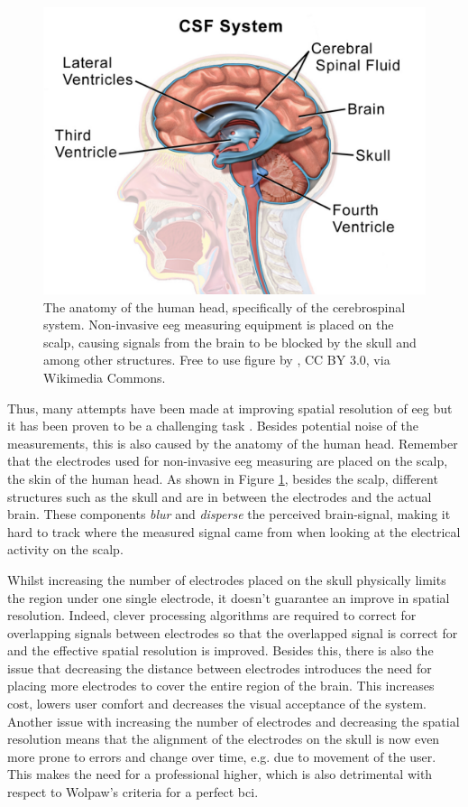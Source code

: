 \begin{figure}[ht]
    \centering
    \includegraphics[width=0.7\linewidth]{../images/introduction/brain_anatomy.pdf}
    \captionsetup{width=0.8\linewidth}
    \captionsetup{justification=centering}
    \caption{The anatomy of the human head, specifically of the cerebrospinal system. Non-invasive \gls{eeg} measuring equipment is placed on the scalp, causing signals from the brain to be blocked by the skull and  among other structures. Free to use figure by \citet{figure_blausen}, CC BY 3.0, via Wikimedia Commons.}
    \label{fig:brain_anatomy}
\end{figure}

Thus, many attempts have been made at improving spatial resolution of \gls{eeg} but it has been proven to be a challenging task \citep{spatial_resolution}.
Besides potential noise of the measurements, this is also caused by the anatomy of the human head.
Remember that the electrodes used for non-invasive \gls{eeg} measuring are placed on the scalp, the skin of the human head.
As shown in Figure \ref{fig:brain_anatomy}, besides the scalp, different structures such as the skull and  are in between the electrodes and the actual brain.
These components \textit{blur} and \textit{disperse} the perceived brain-signal, making it hard to track where the measured signal came from when looking at the electrical activity on the scalp.

Whilst increasing the number of electrodes placed on the skull physically limits the region under one single electrode, it doesn't guarantee an improve in spatial resolution.
Indeed, clever processing algorithms are required to correct for overlapping signals between electrodes so that the overlapped signal is correct for and the effective spatial resolution is improved.
Besides this, there is also the issue that decreasing the distance between electrodes introduces the need for placing more electrodes to cover the entire region of the brain.
This increases cost, lowers user comfort and decreases the visual acceptance of the system.
Another issue with increasing the number of electrodes and decreasing the spatial resolution means that the alignment of the electrodes on the skull is now even more prone to errors and change over time, e.g. due to movement of the user.
This makes the need for a professional higher, which is also detrimental with respect to Wolpaw's criteria for a perfect \gls{bci}.


